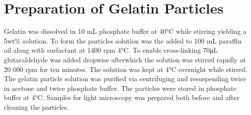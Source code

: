 \section{Preparation of Gelatin Particles}
Gelatin was dissolved in 10 mL phosphate buffer at 40\si{\degreeCelsius} while stirring yielding a 5wt\% solution. To form the particles solution was the added to 100 mL paraffin oil along with surfactant at 1400 rpm 4\si{\degreeCelsius}. To enable cross-linking 70\si{\uL} glutaraldehyde was added dropwise afterwhich the solution was stirred rapidly at 20 000 rpm for ten minutes. The solution was kept at 4\si{\degreeCelsius} overnight while stirred. 
The gelatin particle solution was purified via centrifuging and resuspending twice in acetone and twice phosphate buffer. The particles were stored in phosphate buffer at 4\si{\degreeCelsius}. Samples for light microscopy was prepared both before and after cleaning the particles.